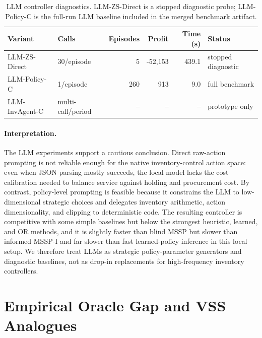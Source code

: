 \documentclass[10pt,a4paper]{article}
\begin{document}
\begin{table}[!tbp]
\centering
\caption{LLM controller diagnostics. LLM-ZS-Direct is a stopped diagnostic
probe; LLM-Policy-C is the full-run LLM baseline included in the merged
benchmark artifact.}
\label{tab:llm_diagnostics}
\small
\renewcommand{\arraystretch}{1.05}
\begin{tabular}{@{} l l r r r l @{}}
\toprule
\textbf{Variant} & \textbf{Calls} & \textbf{Episodes} & \textbf{Profit} & \textbf{Time (s)} & \textbf{Status} \\
\midrule
LLM-ZS-Direct & 30/episode & 5 & -52{,}153 & 439.1 & stopped diagnostic \\
LLM-Policy-C  & 1/episode  & 260 & 913 & 9.0 & full benchmark \\
LLM-InvAgent-C & multi-call/period & -- & -- & -- & prototype only \\
\bottomrule
\end{tabular}
\end{table}

\paragraph{Interpretation.}
The LLM experiments support a cautious conclusion. Direct raw-action
prompting is not reliable enough for the native inventory-control action
space: even when JSON parsing mostly succeeds, the local model lacks the
cost calibration needed to balance service against holding and
procurement cost. By contrast, policy-level prompting is feasible because
it constrains the LLM to low-dimensional strategic choices and delegates
inventory arithmetic, action dimensionality, and clipping to deterministic
code. The resulting controller is competitive with some simple baselines
but below the strongest heuristic, learned, and OR methods, and it is
slightly faster than blind MSSP but slower than informed MSSP-I and far
slower than fast learned-policy inference in this local setup. We
therefore treat LLMs as strategic policy-parameter generators and
diagnostic baselines, not as drop-in replacements for high-frequency
inventory controllers.

\section{Empirical Oracle Gap and VSS Analogues}\label{sec:appendix_vpi}
\end{document}
